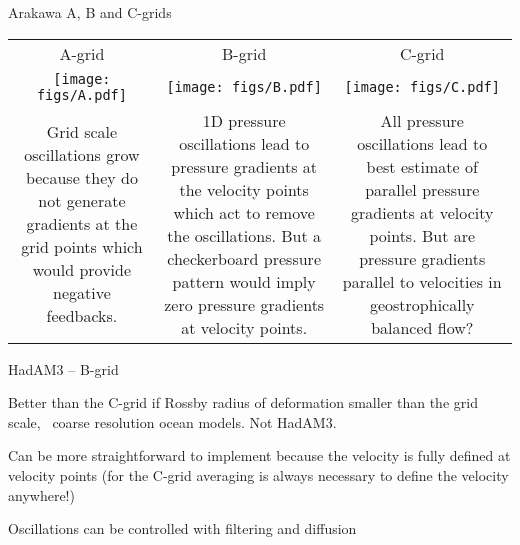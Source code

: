 \begin{slide}

\begin{list1}

\item Arakawa A, B and C-grids

\begin{tabularx}{\linewidth}{CCC}
A-grid & B-grid & C-grid \\
\vspace{-18pt}\texttt{[image: figs/A.pdf]}&
\vspace{-18pt}\texttt{[image: figs/B.pdf]}&
\vspace{-18pt}\texttt{[image: figs/C.pdf]}\\
\vspace{-18pt}Grid scale oscillations grow because they do not generate gradients at the grid points which would provide negative feedbacks.
&
\vspace{-18pt}1D pressure oscillations lead to pressure gradients at the velocity points which act to remove the oscillations. But a checkerboard pressure pattern would imply zero pressure gradients at velocity points.
&
\vspace{-18pt}All pressure oscillations lead to best estimate of parallel pressure gradients at velocity points. But are pressure gradients parallel to velocities in geostrophically balanced flow?
\end{tabularx}

HadAM3 -- B-grid

\begin{list2}
    \item Better than the C-grid if Rossby radius of deformation smaller than the grid scale, \ie\ coarse resolution ocean models. Not HadAM3.
    \item Can be more straightforward to implement because the velocity is fully defined at velocity points (for the C-grid averaging is always necessary to define the velocity anywhere!)
    \item Oscillations can be controlled with filtering and diffusion
\end{list2}

\end{list1}
\end{slide}


